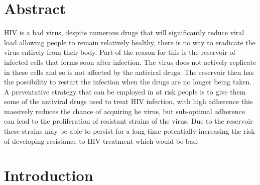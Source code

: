\documentclass[DIV=15]{scrartcl}
\begin{document}
\section*{Abstract}
HIV is a bad  virus, despite numerous drugs that will significantly reduce viral load allowing people to remain relatively healthy, there is no way to eradicate the virus entirely from their body. Part of the reason for this is the reservoir of  infected cells that forms soon after infection. The virus does not actively replicate in these cells and so is not affected by the antiviral drugs. The reservoir then has the possibility to restart the infection when the drugs are no longer being taken. A preventative strategy that can be employed in at risk people is to give them some of the antiviral drugs used to treat HIV infection, with high adherence this massively reduces the chance of acquiring he virus, but sub-optimal adherence can lead to the proliferation  of resistant strains of the virus. Due to the reservoir these strains may be able to persist for a long time potentially increasing the risk of developing resistance  to HIV treatment which would be bad.

\section{Introduction}
\label{intro}
\end{document}
